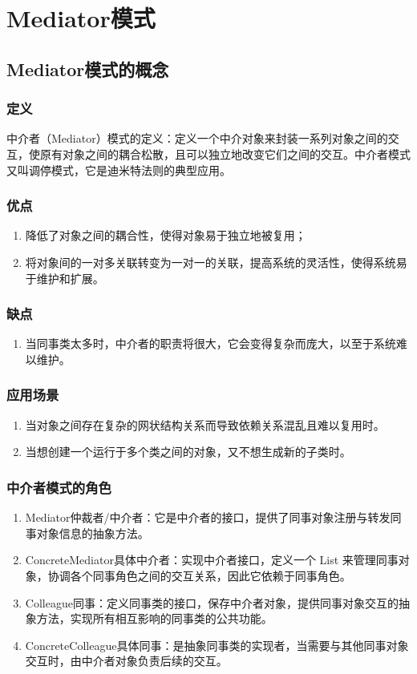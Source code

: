 \chapter{Mediator模式}
\section{Mediator模式的概念}
\subsection{定义}
中介者（Mediator）模式的定义：定义一个中介对象来封装一系列对象之间的交互，使原有对象之间的耦合松散，且可以独立地改变它们之间的交互。中介者模式又叫调停模式，它是迪米特法则的典型应用。
\subsection{优点}
\begin{enumerate}
	\item 降低了对象之间的耦合性，使得对象易于独立地被复用；
	\item 将对象间的一对多关联转变为一对一的关联，提高系统的灵活性，使得系统易于维护和扩展。
\end{enumerate}
\subsection{缺点}
\begin{enumerate}
	\item 当同事类太多时，中介者的职责将很大，它会变得复杂而庞大，以至于系统难以维护。
\end{enumerate}
\subsection{应用场景}
\begin{enumerate}
	\item 当对象之间存在复杂的网状结构关系而导致依赖关系混乱且难以复用时。
	\item 当想创建一个运行于多个类之间的对象，又不想生成新的子类时。
\end{enumerate}
\subsection{中介者模式的角色}
\begin{enumerate}
	\item Mediator仲裁者/中介者：它是中介者的接口，提供了同事对象注册与转发同事对象信息的抽象方法。
	\item ConcreteMediator具体中介者：实现中介者接口，定义一个 List 来管理同事对象，协调各个同事角色之间的交互关系，因此它依赖于同事角色。
	\item Colleague同事：定义同事类的接口，保存中介者对象，提供同事对象交互的抽象方法，实现所有相互影响的同事类的公共功能。
	\item ConcreteColleague具体同事：是抽象同事类的实现者，当需要与其他同事对象交互时，由中介者对象负责后续的交互。
\end{enumerate}
